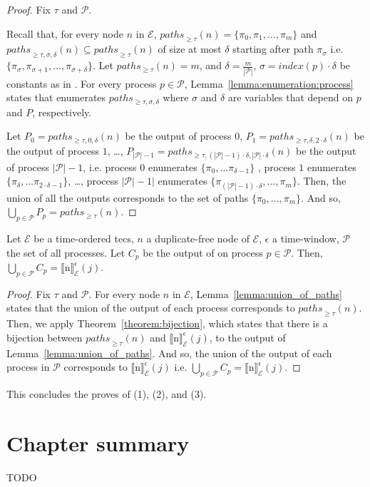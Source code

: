 \begin{proof}
  Fix $\tau$ and $\mathcal{P}$.

  Recall that, for every node $n$ in $\mathcal{E}$, ${paths}_{\ge \tau}(n) = \{ \pi_{0}, \pi_{1}, \ldots, \pi_{m} \}$ and ${paths}_{\ge \tau, \sigma, \delta}(n) \subseteq {paths}_{\ge \tau}(n)$ of size at most $\delta$ starting after path $\pi_{\sigma}$ i.e. $\{ \pi_{\sigma}, \pi_{\sigma+1}, \ldots, \pi_{\sigma+\delta}\}$.
  Let $paths_{\ge \tau}(n) = m$, and $\delta = \frac{m}{|\mathcal{P}|}$, $\sigma = index(p) \cdot \delta$ be constants as in .
  For every process $p \in \mathcal{P}$, Lemma~\ref{lemma:enumeration:process} states that  enumerates $paths_{\ge \tau, \sigma, \delta}$ where $\sigma$ and $\delta$ are variables that depend on $p$ and $P$, respectively.

  Let $P_{0} = paths_{\ge \tau, 0, \delta}(n)$ be the output of process $0$, $P_{1} = paths_{\ge \tau, \delta, 2\cdot\delta}(n)$ be the output of process $1$, \ldots, $P_{|\mathcal{P}| - 1} = paths_{\ge \tau, (|\mathcal{P}| - 1) \cdot \delta, |\mathcal{P}| \cdot \delta}(n)$ be the output of process $|\mathcal{P}| - 1$, i.e. process $0$ enumerates $\{ \pi_{0}, \ldots \pi_{\delta-1} \}$ , process $1$ enumerates $\{\pi_{\delta}, \ldots \pi_{2 \cdot \delta-1}\}$, \ldots, process $|\mathcal{P}| - 1|$ enumerates $\{\pi_{(|\mathcal{P}| - 1) \cdot \delta}, \ldots, \pi_{m}\}$.
  Then, the union of all the outputs corresponds to the set of paths $\{ \pi_{0}, \ldots, \pi_{m} \}$.
  And so, $\bigcup\limits_{p \in \mathcal{P}} P_{p} = paths_{\ge \tau}(n)$.
\end{proof}

\begin{theorem}\label{theorem:enumeration}
  Let $\mathcal{E}$ be a time-ordered \acrshort{tecs}, $n$ a duplicate-free node of $\mathcal{E}$, $\epsilon$ a time-window, $\mathcal{P}$ the set of all processes. Let $C_{p}$ be the output of  on process $p \in \mathcal{P}$. Then, $\bigcup\limits_{p \in \mathcal{P}} C_{p} = {\llbracket \text{n} \rrbracket}^{\epsilon}_{\mathcal{E}}(j)$.
\end{theorem}

\begin{proof}
  Fix $\tau$ and $\mathcal{P}$. For every node $n$ in $\mathcal{E}$, Lemma~\ref{lemma:union_of_paths} states that the union of the output of each process corresponds to ${paths}_{\ge \tau}(n)$. Then, we apply Theorem~\ref{theorem:bijection}, which states that there is a bijection between ${paths}_{\ge \tau}(n)$ and ${\llbracket \text{n} \rrbracket}^{\epsilon}_{\mathcal{E}}(j)$, to the output of Lemma~\ref{lemma:union_of_paths}. And so, the union of the output of each process in $\mathcal{P}$ corresponds to ${\llbracket \text{n} \rrbracket}^{\epsilon}_{\mathcal{E}}(j)$ i.e. $\bigcup\limits_{p \in \mathcal{P}} C_{p} = {\llbracket \text{n} \rrbracket}^{\epsilon}_{\mathcal{E}}(j)$.
\end{proof}

This concludes the proves of (1), (2), and (3).


\section{Chapter summary}

TODO
